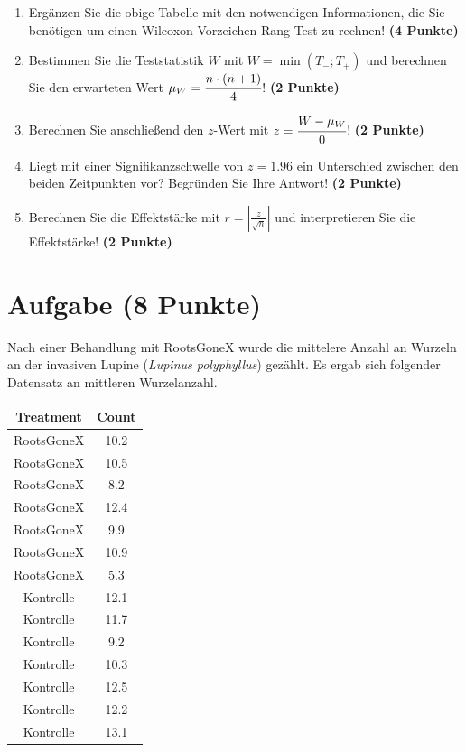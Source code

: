 \documentclass[a4paper, 10pt]{scrartcl}\usepackage[]{graphicx}\usepackage[]{xcolor}
\newenvironment{knitrout}{}{} %
\begin{document}
\begin{enumerate}
\item Erg{\"a}nzen Sie die obige Tabelle mit den notwendigen Informationen, die
  Sie ben{\"o}tigen um einen Wilcoxon-Vorzeichen-Rang-Test zu rechnen!
  \textbf{(4 Punkte)}
\item Bestimmen Sie die Teststatistik $W$ mit $W = \min(T_{-}; T_{+})$ und
  berechnen Sie den erwarteten Wert $\mu_W = \cfrac{n \cdot (n + 1)}{4}$!
  \textbf{(2 Punkte)}
\item Berechnen Sie anschlie{\ss}end den $z$-Wert mit $z = \cfrac{W -
    \mu_W}{0}$! \textbf{(2 Punkte)}
\item Liegt mit einer Signifikanzschwelle von $z =
  1.96$ ein Unterschied zwischen den beiden Zeitpunkten vor? Begr{\"u}nden Sie
  Ihre Antwort! \textbf{(2 Punkte)} 
\item Berechnen Sie die Effektst{\"a}rke mit $r = |\frac{z}{\sqrt{n}}| $ und
  interpretieren Sie die Effektst{\"a}rke! \textbf{(2 Punkte)} 
\end{enumerate} 
\clearpage

\section{Aufgabe \hfill (8 Punkte)}



Nach einer Behandlung mit RootsGoneX wurde die mittelere Anzahl an Wurzeln
an der invasiven Lupine (\textit{Lupinus polyphyllus}) gez{\"a}hlt. Es ergab sich
folgender Datensatz an mittleren Wurzelanzahl.

\begin{knitrout}
\color{fgcolor}\begin{table}[!h]
\centering
\begin{tabular}{cc}
\toprule
Treatment & Count\\
\midrule
RootsGoneX & 10.2\\
RootsGoneX & 10.5\\
RootsGoneX & 8.2\\
RootsGoneX & 12.4\\
RootsGoneX & 9.9\\
\addlinespace
RootsGoneX & 10.9\\
RootsGoneX & 5.3\\
Kontrolle & 12.1\\
Kontrolle & 11.7\\
Kontrolle & 9.2\\
\addlinespace
Kontrolle & 10.3\\
Kontrolle & 12.5\\
Kontrolle & 12.2\\
Kontrolle & 13.1\\
\bottomrule
\end{tabular}
\end{table}

\end{knitrout}
\end{document}
